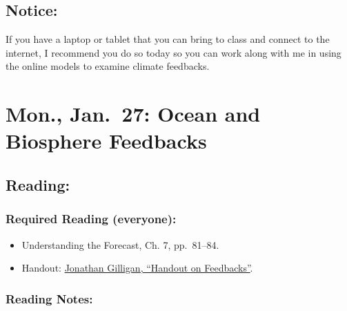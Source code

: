 \documentclass[
]{article}
\providecommand{\tightlist}{%
  \setlength{\itemsep}{0pt}\setlength{\parskip}{0pt}}
\begin{document}
\hypertarget{notice-4}{%
\subsection{Notice:}\label{notice-4}}

If you have a laptop or tablet that you can bring to class and connect
to the internet, I recommend you do so today so you can work along with
me in using the online models to examine climate feedbacks.

\hypertarget{mon.-jan.-27-ocean-and-biosphere-feedbacks}{%
\section{Mon., Jan.~27: Ocean and Biosphere
Feedbacks}\label{mon.-jan.-27-ocean-and-biosphere-feedbacks}}

\hypertarget{reading-8}{%
\subsection{Reading:}\label{reading-8}}

\hypertarget{required-reading-everyone-6}{%
\subsubsection{Required Reading
(everyone):}\label{required-reading-everyone-6}}

\begin{itemize}
\tightlist
\item
  Understanding the Forecast, Ch. 7, pp.~81--84.
\item
  Handout: \href{/files/reading_handouts/Feedback_Handout.pdf}{Jonathan
  Gilligan, ``Handout on Feedbacks''}.
\end{itemize}

\hypertarget{reading-notes-6}{%
\subsubsection{Reading Notes:}\label{reading-notes-6}}
\end{document}
